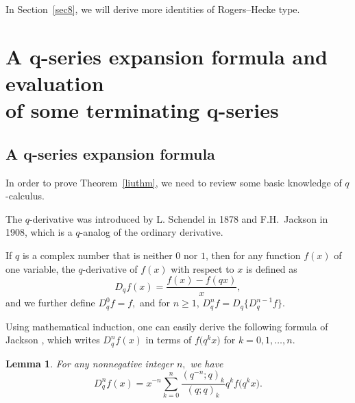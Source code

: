 \documentclass[10pt,a4paper]{amsart}
\numberwithin{equation}{section}
\newtheorem{Lemma}[Theorem]{Lemma}
\begin{document}
In Section~\ref{sec8}, we will derive more identities of Rogers--Hecke type.


\section[A q-series expansion formula and evaluation of some terminating q-series]{A $\boldsymbol{q}$-series expansion formula and evaluation \\ of some terminating $\boldsymbol{q}$-series}\label{sec2}

\subsection[A q-series expansion formula]{A $\boldsymbol{q}$-series expansion formula}
In order to prove Theorem~\ref{liuthm}, we need to review some basic knowledge of $q$-calculus.

The $q$-derivative was introduced by L. Schendel \cite{Schendel} in 1878 and F.H.~Jackson \cite{Jackson1908} in 1908, which is a $q$-analog of the ordinary derivative.
\begin{Definition}%
	If $q$ is a complex number that is neither $0$ nor $1$, then for any function $f(x)$ of one variable, the $q$-derivative of $f(x)$
	with respect to $x$ is defined as
	\begin{equation*}
		{D}_{q}f(x)=\frac{f(x)-f(qx)}{x},
	\end{equation*}
	and we further define ${D}_{q}^0 f=f,$ and for $n\ge 1$, ${D}_{q}^n f={D}_{q}\bigl\{{D}_{q}^{n-1}f\bigr\}.$
\end{Definition}

Using mathematical induction, one can easily derive the following formula of Jackson \cite{Jackson1908}, which writes
${D}^n_{q}f(x) $ in terms of $f\bigl(q^k x\bigr)$ for $k=0, 1, \ldots, n$.
\begin{Lemma}\label{JacsonLem} For any nonnegative integer $n,$ we have
	\[
	{D}^n_{q}f(x)=x^{-n} \sum_{k=0}^n \frac{(q^{-n}; q)_k}{(q; q)_k}q^k f\bigl(q^k x\bigr).
	\]
\end{Lemma}
\end{document}
